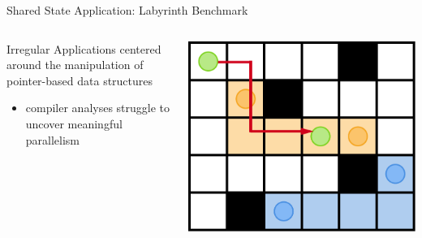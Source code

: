 \documentclass[aspectratio=169, usenames, dvipsnames]{beamer}
\begin{document}
\begin{frame}{Shared State Application: Labyrinth Benchmark}
  \begin{columns}
    \begin{column}{0.5\textwidth}
        \begin{block}{Irregular Applications}
            centered around the manipulation of pointer-based data structures
        \end{block}

        \begin{itemize}
            \item compiler analyses struggle to uncover meaningful parallelism
        \end{itemize}
    \end{column}
    \begin{column}{0.5\textwidth}
      \begin{center}
        \includegraphics[width=.9\textwidth]{img/5-maze_update3}%
      \end{center}
    \end{column}
  \end{columns}
\end{frame}
\end{document}
